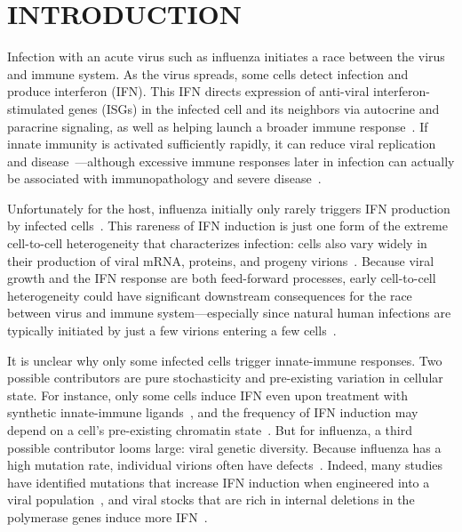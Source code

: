 \documentclass[10pt,letterpaper]{article}
\begin{document}
\linenumbers

\section*{INTRODUCTION}
Infection with an acute virus such as influenza initiates a race between the virus and immune system.
As the virus spreads, some cells detect infection and produce interferon (IFN).
This IFN directs expression of anti-viral interferon-stimulated genes (ISGs) in the infected cell and its neighbors via autocrine and paracrine signaling, as well as helping launch a broader immune response~\citep{stetson2006type,honda2006type}.
If innate immunity is activated sufficiently rapidly, it can reduce viral replication and disease~\citep{solov1969results,treanor1987intranasally,beilharz2007protection,kugel2009intranasal,steel2010transmission}---although excessive immune responses later in infection can actually be associated with immunopathology and severe disease~\citep{la2007question, iwasaki2014innate}.

Unfortunately for the host, influenza initially only rarely triggers IFN production by infected cells~\citep{kallfass2013visualizing, killip2017single}.
This rareness of IFN induction is just one form of the extreme cell-to-cell heterogeneity that characterizes infection: cells also vary widely in their production of viral mRNA, proteins, and progeny virions~\citep{russell2018extreme,steuerman2018dissection,sjaastad2018distinct,heldt2015single}.
Because viral growth and the IFN response are both feed-forward processes, early cell-to-cell heterogeneity could have significant downstream consequences for the race between virus and immune system---especially since natural human infections are typically initiated by just a few virions entering a few cells~\citep{mccrone2018stochastic, xue2018reconciling, varble2014influenza}.

It is unclear why only some infected cells trigger innate-immune responses.
Two possible contributors are pure stochasticity and pre-existing variation in cellular state.
For instance, only some cells induce IFN even upon treatment with synthetic innate-immune ligands~\citep{shalek2013single, shalek2014single, wimmers2018single}, and the frequency of IFN induction may depend on a cell's pre-existing chromatin state~\citep{bhushal2017cell}.
But for influenza, a third possible contributor looms large: viral genetic diversity.
Because influenza has a high mutation rate, individual virions often have defects~\citep{parvin1986measurement, suarez1992heterogeneity, bloom2014experimentally, pauly2017novel}.
Indeed, many studies have identified mutations that increase IFN induction when engineered into a viral population~\citep{velthuis2018mini, du2018genome, killip2017single, perez2014unbiased}, and viral stocks that are rich in internal deletions in the polymerase genes induce more IFN~\citep{baum2010preference, tapia2013defective, boergeling2015evidence, dimmock2015cloned}.
\end{document}
